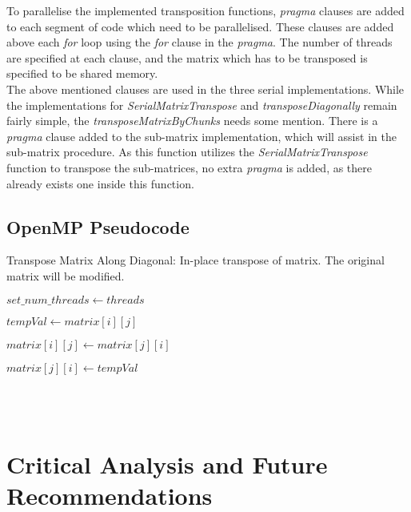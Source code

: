 \documentclass[a4paper, 11pt, onecolumn, conference]{IEEEtran}      %
\begin{document}
To parallelise the implemented transposition functions, \textit{pragma} clauses are added to each segment of code which need to be parallelised. These clauses are added above each \textit{for} loop using the \textit{for} clause in the \textit{pragma}. The number of threads are specified at each clause, and the matrix which has to be transposed is specified to be shared memory.\\

The above mentioned clauses are used in the three serial implementations. While the implementations for \textit{SerialMatrixTranspose} and \textit{transposeDiagonally} remain fairly simple, the \textit{transposeMatrixByChunks} needs some mention. There is a \textit{pragma} clause added to the sub-matrix implementation, which will assist in the sub-matrix procedure. As this function utilizes the \textit{SerialMatrixTranspose} function to transpose the sub-matrices, no extra \textit{pragma} is added, as there already exists one inside this function.

\subsection{OpenMP Pseudocode}

Transpose Matrix Along Diagonal: In-place transpose of matrix. The original matrix will be modified.

\begin{algorithmic}


$set\_num\_threads \gets threads$

      
      $tempVal \gets matrix[i][j]$
      
      $matrix[i][j] \gets matrix[j][i]$
      
      $matrix[j][i] \gets tempVal$
    \EndFor
\EndFor

\EndFunction \\ \\

\end{algorithmic}


\section{Critical Analysis and Future Recommendations}
\end{document}
